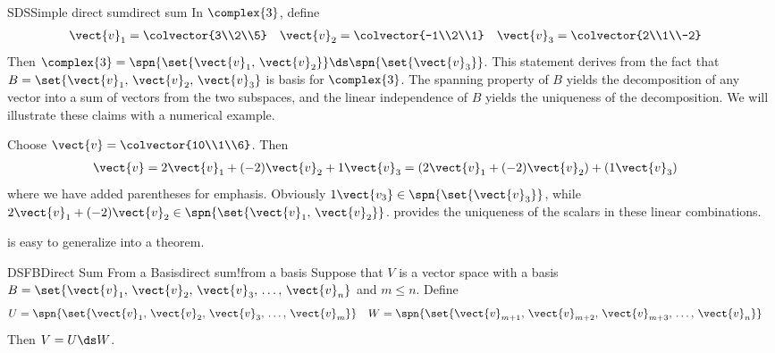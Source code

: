 \begin{example}{SDS}{Simple direct sum}{direct sum}
In $\complex{3}$, define
%
\begin{align*}
\vect{v}_1&=\colvector{3\\2\\5}
&
\vect{v}_2&=\colvector{-1\\2\\1}
&
\vect{v}_3&=\colvector{2\\1\\-2}
\end{align*}
%
Then $\complex{3}=\spn{\set{\vect{v}_1,\,\vect{v}_2}}\ds\spn{\set{\vect{v}_3}}$.  This statement derives from the fact that $B=\set{\vect{v}_1,\,\vect{v}_2,\,\vect{v}_3}$ is basis for $\complex{3}$.  The spanning property of $B$ yields the decomposition of any vector into a sum of vectors from the two subspaces, and the linear independence of $B$ yields the uniqueness of the decomposition.  We will illustrate these claims with a numerical example.\par
Choose $\vect{v}=\colvector{10\\1\\6}$.  Then
%
\begin{align*}
\vect{v}
&=2\vect{v}_1+(-2)\vect{v}_2+1\vect{v}_3
=\left(2\vect{v}_1+(-2)\vect{v}_2\right)+\left(1\vect{v}_3\right)
\end{align*}
%
where we have added parentheses for emphasis.  Obviously $1\vect{v_3}\in\spn{\set{\vect{v}_3}}$, while $2\vect{v}_1+(-2)\vect{v}_2\in\spn{\set{\vect{v}_1,\,\vect{v}_2}}$.   provides the uniqueness of the scalars in these linear combinations.
%
\end{example}
%
 is easy to generalize into a theorem.
%
\begin{theorem}{DSFB}{Direct Sum From a Basis}{direct sum!from a basis}
Suppose that $V$ is a vector space with a basis
$B=\set{\vect{v}_1,\,\vect{v}_2,\,\vect{v}_3,\,\dots,\,\vect{v}_n}$ and $m\leq n$.  Define
%
\begin{align*}
U&=\spn{\set{\vect{v}_1,\,\vect{v}_2,\,\vect{v}_3,\,\dots,\,\vect{v}_m}}
&
W&=\spn{\set{\vect{v}_{m+1},\,\vect{v}_{m+2},\,\vect{v}_{m+3},\,\dots,\,\vect{v}_n}}
\end{align*}
%
Then $V=U\ds W$.
\end{theorem}
%
